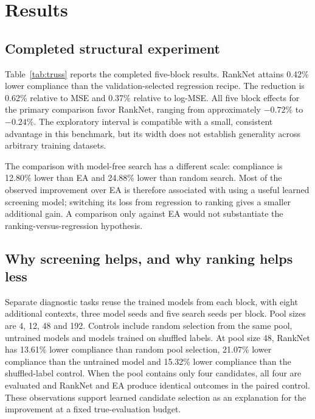 \documentclass[11pt,a4paper]{article}
\begin{document}
\section{Results}
\subsection{Completed structural experiment}
Table~\ref{tab:truss} reports the completed five-block results. RankNet attains 0.42\% lower compliance than the validation-selected regression recipe. The reduction is 0.62\% relative to MSE and 0.37\% relative to log-MSE. All five block effects for the primary comparison favor RankNet, ranging from approximately $-0.72\%$ to $-0.24\%$. The exploratory interval is compatible with a small, consistent advantage in this benchmark, but its width does not establish generality across arbitrary training datasets.


The comparison with model-free search has a different scale: compliance is 12.80\% lower than EA and 24.88\% lower than random search. Most of the observed improvement over EA is therefore associated with using a useful learned screening model; switching its loss from regression to ranking gives a smaller additional gain. A comparison only against EA would not substantiate the ranking-versus-regression hypothesis.

\subsection{Why screening helps, and why ranking helps less}
Separate diagnostic tasks reuse the trained models from each block, with eight additional contexts, three model seeds and five search seeds per block. Pool sizes are 4, 12, 48 and 192. Controls include random selection from the same pool, untrained models and models trained on shuffled labels. At pool size 48, RankNet has 13.61\% lower compliance than random pool selection, 21.07\% lower compliance than the untrained model and 15.32\% lower compliance than the shuffled-label control. When the pool contains only four candidates, all four are evaluated and RankNet and EA produce identical outcomes in the paired control. These observations support learned candidate selection as an explanation for the improvement at a fixed true-evaluation budget.
\end{document}
